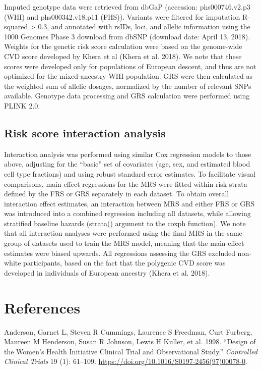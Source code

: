 \documentclass[]{article}
\begin{document}
Imputed genotype data were retrieved from dbGaP (accession:
phs000746.v2.p3 (WHI) and phs000342.v18.p11 (FHS)). Variants were
filtered for imputation R-squared \textgreater{} 0.3, and annotated with
rsIDs, loci, and allelic information using the 1000 Genomes Phase 3
download from dbSNP (download date: April 13, 2018). Weights for the
genetic risk score calculation were based on the genome-wide CVD score
developed by Khera et al (Khera et al. 2018). We note that these scores
were developed only for populations of European descent, and thus are
not optimized for the mixed-ancestry WHI population. GRS were then
calculated as the weighted sum of allelic dosages, normalized by the
number of relevant SNPs available. Genotype data processing and GRS
calculation were performed using PLINK 2.0.

\hypertarget{risk-score-interaction-analysis}{%
\subsection{Risk score interaction
analysis}\label{risk-score-interaction-analysis}}

Interaction analysis was performed using similar Cox regression models
to those above, adjusting for the ``basic'' set of covariates (age, sex,
and estimated blood cell type fractions) and using robust standard error
estimates. To facilitate visual comparisons, main-effect regressions for
the MRS were fitted within risk strata defined by the FRS or GRS
separately in each dataset. To obtain overall interaction effect
estimates, an interaction between MRS and either FRS or GRS was
introduced into a combined regression including all datasets, while
allowing stratified baseline hazards (strata() argument to the coxph
function). We note that all interaction analyses were performed using
the final MRS in the same group of datasets used to train the MRS model,
meaning that the main-effect estimates were biased upwards. All
regressions assessing the GRS excluded non-white participants, based on
the fact that the polygenic CVD score was developed in individuals of
European ancestry (Khera et al. 2018).

\hypertarget{references}{%
\section*{References}\label{references}}

\hypertarget{refs}{}
\leavevmode\hypertarget{ref-Anderson1998}{}%
Anderson, Garnet L, Steven R Cummings, Laurence S Freedman, Curt
Furberg, Maureen M Henderson, Susan R Johnson, Lewis H Kuller, et al.
1998. ``Design of the Women's Health Initiative Clinical Trial and
Observational Study.'' \emph{Controlled Clinical Trials} 19 (1):
61--109. \url{https://doi.org/10.1016/S0197-2456(97)00078-0}.
\end{document}
